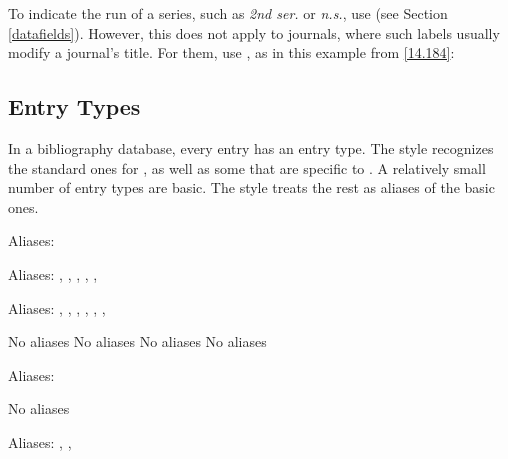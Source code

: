 \documentclass[11pt,letterpaper,oneside]{article}
\begin{document}
\begin{citebib}
\item \cite{cochrane1987}
\end{citebib}

To indicate the run of a series, such as \textit{2nd ser.} or
\textit{n.s.}, use  (see Section
\ref{datafields}). However, this does not apply to journals, where
such labels usually modify a journal's title. For them, use
, as in this example from \ref{14.184}:

\begin{citebib}
\item \cite{moraes1950}
\end{citebib}

\subsection{Entry Types}
\label{entrytypes}

In a bibliography database, every entry has an entry type. The style
recognizes the standard ones for \BibTeX, as well as some that are
specific to \biblatex. A relatively small number of entry types are
basic. The style treats the rest as aliases of the basic ones.

\begin{typelist}
\RaggedRight


Aliases: 


Aliases: , , ,
, , 


Aliases: , ,
, , ,
, 

 No aliases
 No aliases
 No aliases
 No aliases


Aliases: 

 No aliases


Aliases: , ,

\end{typelist}
\end{document}
